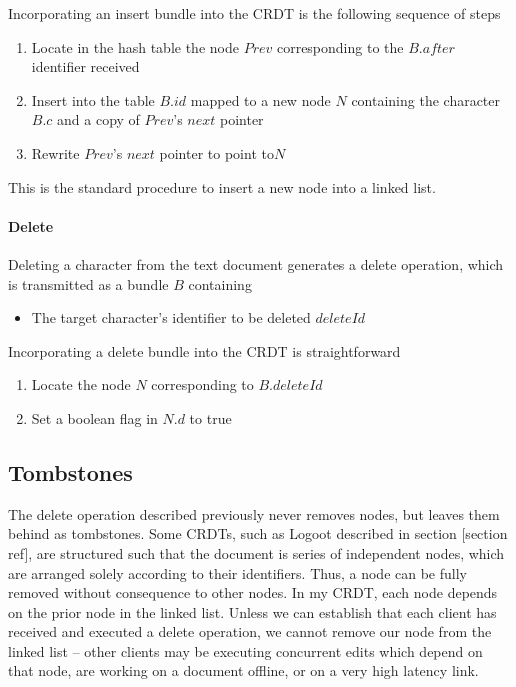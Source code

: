 \documentclass[12pt,a4paper,twoside,openright]{report}
\begin{document}
				Incorporating an insert bundle into the CRDT is the following sequence of steps
				\begin{enumerate}
					\item Locate in the hash table the node $Prev$ corresponding to the $B.after$ identifier received
					\item Insert into the table $B.id$ mapped to a new node $N$ containing the character $B.c$ and a copy of $Prev$'s $next$ pointer
					\item Rewrite $Prev$'s $next$ pointer to point to$N$
				\end{enumerate}
				This is the standard procedure to insert a new node into a linked list.
				
			\paragraph{Delete}
				Deleting a character from the text document generates a delete operation, which is transmitted as a bundle $B$ containing
				\begin{itemize}
					\item The target character's identifier to be deleted $deleteId$
				\end{itemize}
				
				Incorporating a delete bundle into the CRDT is straightforward
				\begin{enumerate}
					\item Locate the node $N$ corresponding to $B.deleteId$
					\item Set a boolean flag in $N.d$ to true
				\end{enumerate}
				
		\subsection{Tombstones}
			The delete operation described previously never removes nodes, but leaves them behind as tombstones. Some CRDTs, such as Logoot described in section [section ref], are structured such that the document is series of independent nodes, which are arranged solely according to their identifiers. Thus, a node can be fully removed without consequence to other nodes. In my CRDT, each node depends on the prior node in the linked list. Unless we can establish that each client has received and executed a delete operation, we cannot remove our node from the linked list -- other clients may be executing concurrent edits which depend on that node, are working on a document offline, or on a very high latency link.
			
\end{document}
